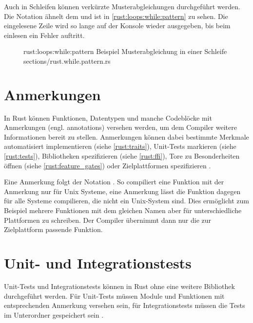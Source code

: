 Auch in  Schleifen können verkürzte Musterabgleichungen durchgeführt werden.
Die Notation ähnelt dem  und ist in \autoref{rust:loops:while:pattern} zu sehen.
Die eingelesene Zeile wird so lange auf der Konsole wieder ausgegeben, bis beim einlesen ein Fehler auftritt.

\begin{figure}[H]
	\rustcinclude
		{rust:loops:while:pattern}
		{Beispiel Musterabgleichung in einer  Schleife}
		{sections/rust.while.pattern.rs}
\end{figure}

\section{Anmerkungen}
\label{rust:annotations}

In Rust können Funktionen, Datentypen und manche Codeblöcke mit Anmerkungen (engl. annotations) versehen werden, um dem Compiler weitere Informationen bereit zu stellen.
Anmerkungen können dabei bestimmte Merkmale automatisiert implementieren (siehe \autoref{rust:traits}), Unit-Tests markieren (siehe \autoref{rust:tests}), Bibliotheken spezifizieren (siehe \autoref{rust:ffi}),  Tore zu Besonderheiten öffnen (siehe \autoref{rust:feature_gates})  oder  Zielplattformen spezifizieren \cite{rust:book:annotation:cfg}.

Eine Anmerkung folgt der Notation . So compiliert eine Funktion mit der Anmerkung  nur für Unix Systeme, eine Anmerkung  lässt die Funktion dagegen für alle Systeme compilieren, die nicht ein Unix-System sind.
Dies ermöglicht zum Beispiel mehrere Funktionen mit dem gleichen Namen aber für unterschiedliche Plattformen zu schreiben.
Der Compiler übernimmt dann nur die zur Zielplattform passende Funktion.

\section{Unit- und Integrationstests}
\label{rust:tests}

Unit-Tests und Integrationstests können in Rust ohne eine weitere Bibliothek durchgeführt werden.
Für Unit-Tests müssen Module und Funktionen mit entsprechenden Anmerkung versehen sein, für Integrationstests müssen die Tests im Unterordner  gespeichert sein \cite{rust:book:tests}.


